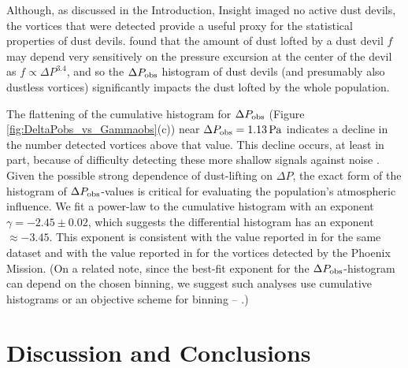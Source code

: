 \documentclass{aastex63}
\begin{document}
Although, as discussed in the Introduction, Insight imaged no active dust devils, the vortices that were detected provide a useful proxy for the statistical properties of dust devils. \citet{2010Icar..206..306N} found that the amount of dust lofted by a dust devil $f$ may depend very sensitively on the pressure excursion at the center of the devil as $f \propto \Delta P^{3.4}$, and so the $\Delta P_{\rm obs}$ histogram of dust devils (and presumably also dustless vortices) significantly impacts the dust lofted by the whole population. 

The flattening of the cumulative histogram for $\Delta P_{\rm obs}$ (Figure \ref{fig:DeltaPobs_vs_Gammaobs}(c)) near $\Delta P_{\rm obs} = 1.13\,{\rm Pa}$ indicates a decline in the number detected vortices above that value. This decline occurs, at least in part, because of difficulty detecting these more shallow signals against noise  \citep{2018Icar..299..166J}. Given the possible strong dependence of dust-lifting on $\Delta P$, the exact form of the histogram of $\Delta P_{\rm obs}$-values is critical for evaluating the population's atmospheric influence. We fit a power-law to the cumulative histogram with an exponent $\gamma = -2.45\pm0.02$, which suggests the differential histogram has an exponent $\approx -3.45$. This exponent is consistent with the value reported in  \citet{2020arXiv200501134S} for the same dataset and with the value reported in \citet{2018Icar..299..166J} for the vortices detected by the Phoenix Mission. (On a related note, since the best-fit exponent for the $\Delta P_{\rm obs}$-histogram can depend on the chosen binning, we suggest such analyses use cumulative histograms or an objective scheme for binning -- \citealp{2016SSRv..203..277L}.)

\section{Discussion and Conclusions}
\label{sec:Discussion and Conclusions}
\end{document}
